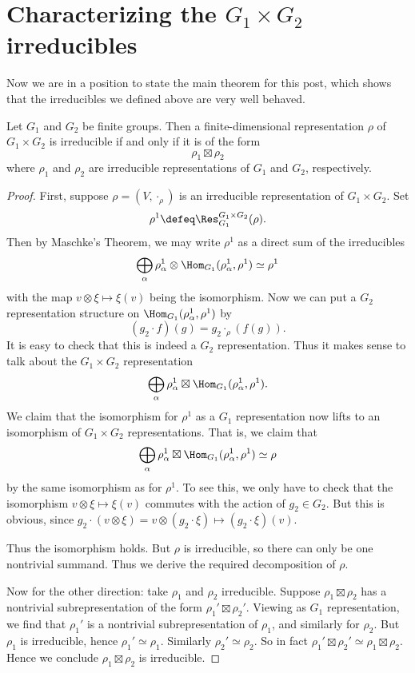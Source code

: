 \section{Characterizing the $G_1 \times G_2$ irreducibles}
Now we are in a position to state the main theorem for this post, which shows that the irreducibles we defined above are very well behaved.
\begin{theorem}
	Let $G_1$ and $G_2$ be finite groups.
	Then a finite-dimensional representation $\rho$ of $G_1 \times G_2$
	is irreducible if and only if it is of the form
	\[ \rho_1 \boxtimes \rho_2 \]
	where $\rho_1$ and $\rho_2$ are irreducible representations
	of $G_1$ and $G_2$, respectively.
\end{theorem}

\begin{proof}
First, suppose $\rho = (V, \cdot_\rho)$ is an irreducible representation of $G_1 \times G_2$.
Set \[ \rho^1 \defeq \Res^{G_1 \times G_2}_{G_1} (\rho). \]
Then by Maschke's Theorem, we may write $\rho^1$ as a
direct sum of the irreducibles
\[
	\bigoplus_\alpha \rho_\alpha^1 \otimes \Hom_{G_1} (\rho_\alpha^1, \rho^1) \simeq \rho^1
\]
with the map $v \otimes \xi \mapsto \xi(v)$ being the isomorphism.
Now we can put a $G_2$ representation structure on $\Hom_{G_1} (\rho_\alpha^1, \rho^1)$ by
\[
	(g_2 \cdot f)(g) 
	= g_2 \cdot_{\rho} (f(g)).
\]
It is easy to check that this is indeed a $G_2$ representation.
Thus it makes sense to talk about the $G_1 \times G_2$ representation
\[
	\bigoplus_\alpha \rho_\alpha^1 \boxtimes \Hom_{G_1} (\rho_\alpha^1, \rho^1). \]
We claim that the isomorphism for $\rho^1$ as a $G_1$ representation now lifts to an isomorphism of $G_1 \times G_2$ representations.
That is, we claim that
\[
	\bigoplus_\alpha \rho_\alpha^1 \boxtimes \Hom_{G_1} (\rho_\alpha^1, \rho^1) \simeq \rho
\]
by the same isomorphism as for $\rho^1$.
To see this, we only have to check that the isomorphism $v \otimes \xi \mapsto \xi(v)$ commutes with the action of $g_2 \in G_2$.
But this is obvious, since $g_2 \cdot (v \otimes \xi) = v \otimes (g_2 \cdot \xi) \mapsto (g_2 \cdot \xi)(v)$.

Thus the isomorphism holds.
But $\rho$ is irreducible, so there can only be one nontrivial summand.
Thus we derive the required decomposition of $\rho$.

Now for the other direction: take $\rho_1$ and $\rho_2$ irreducible.
Suppose $\rho_1 \boxtimes \rho_2$ has a nontrivial subrepresentation of the form $\rho_1' \boxtimes \rho_2'$.
Viewing as $G_1$ representation, we find that $\rho_1'$ is a nontrivial subrepresentation of $\rho_1$, and similarly for $\rho_2$.
But $\rho_1$ is irreducible, hence $\rho_1' \simeq \rho_1$.
Similarly $\rho_2' \simeq \rho_2$.
So in fact $\rho_1' \boxtimes \rho_2' \simeq \rho_1 \boxtimes \rho_2$.
Hence we conclude $\rho_1 \boxtimes \rho_2$ is irreducible.
\end{proof}

